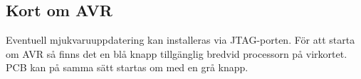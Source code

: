 \subsection{Kort om AVR}
Eventuell mjukvaruuppdatering kan installeras via JTAG-porten.
\newline
För att starta om AVR så finns det en blå knapp tillgänglig bredvid processorn på virkortet. PCB kan på samma sätt startas om med en grå knapp.
